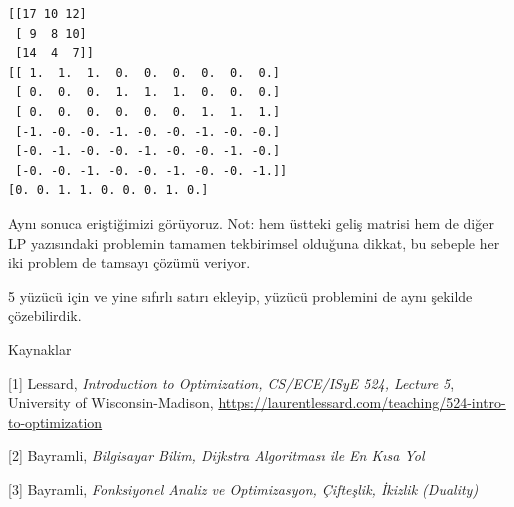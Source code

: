 \documentclass[12pt,fleqn]{article}\usepackage{../../common}
\begin{document}
\begin{verbatim}
[[17 10 12]
 [ 9  8 10]
 [14  4  7]]
[[ 1.  1.  1.  0.  0.  0.  0.  0.  0.]
 [ 0.  0.  0.  1.  1.  1.  0.  0.  0.]
 [ 0.  0.  0.  0.  0.  0.  1.  1.  1.]
 [-1. -0. -0. -1. -0. -0. -1. -0. -0.]
 [-0. -1. -0. -0. -1. -0. -0. -1. -0.]
 [-0. -0. -1. -0. -0. -1. -0. -0. -1.]]
[0. 0. 1. 1. 0. 0. 0. 1. 0.]
\end{verbatim}

Aynı sonuca eriştiğimizi görüyoruz. Not: hem üstteki geliş matrisi hem de
diğer LP yazısındaki problemin tamamen tekbirimsel olduğuna dikkat, bu
sebeple her iki problem de tamsayı çözümü veriyor. 

5 yüzücü için ve yine sıfırlı satırı ekleyip, yüzücü problemini de aynı
şekilde çözebilirdik. 

Kaynaklar

[1] Lessard, {\em Introduction to Optimization, CS/ECE/ISyE 524, Lecture 5}, 
    University of Wisconsin-Madison,
    \url{https://laurentlessard.com/teaching/524-intro-to-optimization}

[2] Bayramli, {\em Bilgisayar Bilim, Dijkstra Algoritması ile En Kısa Yol}

[3] Bayramli, {\em Fonksiyonel Analiz ve Optimizasyon, Çifteşlik, İkizlik (Duality)}
\end{document}

